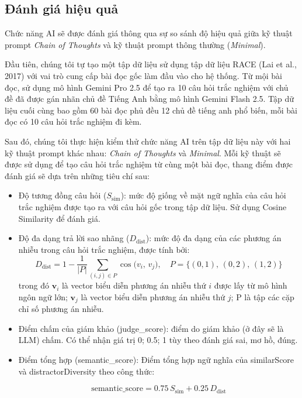 \documentclass{uetgraduation}
\newcommand{\similarScore}{\ensuremath{S_{\text{sim}}}} %
\newcommand{\distractorDiversity}{\ensuremath{D_{\text{dist}}}} %
\newcommand{\semanticScoreTotal}{\ensuremath{\mathrm{semantic\_score}}}
\begin{document}
\subsection{Đánh giá hiệu quả}
Chức năng AI sẽ được đánh giá thông qua sự so sánh độ hiệu quả giữa kỹ thuật prompt \textit{Chain of Thoughts} và kỹ thuật prompt thông thường (\textit{Minimal}).\par
Đầu tiên, chúng tôi tự tạo một tập dữ liệu sử dụng tập dữ liệu RACE (Lai et al., 2017)\cite{RACE} với vai trò cung cấp bài đọc gốc làm
đầu vào cho hệ thống. Từ mội bài đọc, sử dụng mô hình Gemini Pro 2.5 để tạo ra 10 câu hỏi trắc nghiệm với chủ đề
đã được gán nhãn chủ đề Tiếng Anh bằng mô hình Gemini Flash 2.5. Tập dữ liệu cuối cùng bao gồm
60 bài đọc phủ đều 12 chủ đề tiếng anh phổ biến, mỗi bài đọc có 10 câu hỏi trắc nghiệm đi kèm.\par
Sau đó, chúng tôi thực hiện kiểm thử chức năng AI trên tập dữ liệu này với hai kỹ thuật prompt khác nhau: \textit{Chain of Thoughts} và \textit{Minimal}.
Mỗi kỹ thuật sẽ được sử dụng để tạo câu hỏi trắc nghiệm từ cùng một bài đọc, thang điểm được đánh giá sẽ dựa trên những tiêu chí sau:
\begin{itemize}
    \item Độ tương đồng câu hỏi (\similarScore): mức độ giống về mặt ngữ nghĩa của câu hỏi trắc nghiệm được tạo ra với câu hỏi gốc trong tập dữ liệu. Sử dụng Cosine Similarity để đánh giá.
    \item Độ đa dạng trả lời sao nhãng (\distractorDiversity): mức độ đa dạng của các phương án nhiễu trong câu hỏi trắc nghiệm, được tính bởi:
    \begin{equation*}
        \distractorDiversity
        = 1 - \frac{1}{|P|}\sum_{(i,j)\in P} \cos\big(v_{i},\, v_{j}\big),\quad
        P = \{(0,1),\,(0,2),\,(1,2)\}
    \end{equation*}
    trong đó $\mathbf v_{i}$ là vector biểu diễn phương án nhiễu thứ $i$ được lấy từ mô hình ngôn ngữ lớn; $\mathbf v_{j}$ là vector biểu diễn phương án nhiễu thứ $j$; P là tập các cặp chỉ số phương án nhiễu.
    \item Điểm chấm của giám khảo (judge\_score): điểm do giám khảo (ở đây sẽ là LLM) chấm. Có thể nhận giá trị 0; 0.5; 1 tùy theo đánh giá sai, mơ hồ, đúng.
    \item Điểm tổng hợp (semantic\_score): Điểm tổng hợp ngữ nghĩa của similarScore và distractorDiversity theo công thức:
    
    \begin{equation*}
        \semanticScoreTotal = 0.75\,\similarScore + 0.25\,\distractorDiversity
    \end{equation*}
\end{itemize}
\end{document}
